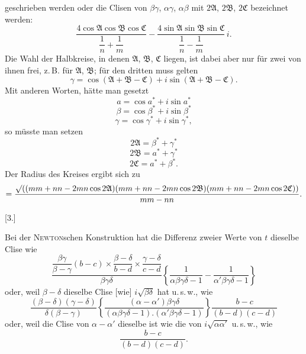 %
geschrieben werden oder die Clisen von $\beta\gamma$, $\alpha\gamma$, $\alpha\beta$ mit $2\mathfrak{A}$, $2\mathfrak{B}$, $2\mathfrak{C}$ bezeichnet werden:
\[
\frac{4\cos\mathfrak{A}\cos\mathfrak{B}\cos\mathfrak{C}}{\dfrac{1}{n}+\dfrac{1}{m}} - \frac{4\sin\mathfrak{A}\sin\mathfrak{B}\sin\mathfrak{C}}{\dfrac{1}{n}-\dfrac{1}{m}}\, i.
\]
Die Wahl der Halbkreise, in denen $\mathfrak{A}$, $\mathfrak{B}$, $\mathfrak{C}$ liegen, ist dabei aber nur für zwei von ihnen frei, z.\,B. für $\mathfrak{A}$, $\mathfrak{B}$; für den dritten muss gelten
\[
\gamma = \cos(\mathfrak{A}+\mathfrak{B}-\mathfrak{C}) + i\sin(\mathfrak{A}+\mathfrak{B}-\mathfrak{C}).
\]
Mit anderen Worten, hätte man gesetzt
\[
a = \cos a^{*} + i\sin a^{*}
\]
\[
\beta = \cos \beta^{*} + i\sin \beta^{*}
\]
\[
\gamma = \cos \gamma^{*} + i\sin \gamma^{*},
\]
so müsste man setzen
\[
2\mathfrak{A} = \beta^{*}+\gamma^{*}
\]
\[
2\mathfrak{B} = a^{*}+\gamma^{*}
\]
\[
2\mathfrak{C} = a^{*}+\beta^{*}.
\]
Der Radius des Kreises ergibt sich zu
\begingroup\small
\[
= \frac{\mathord{\surd}((mm+nn-2mn\cos 2\mathfrak{A})(mm+nn-2mn\cos 2\mathfrak{B})(mm+nn-2mn\cos 2\mathfrak{C}))}{mm-nn}.
\]
\endgroup

\begin{center}[3.]\end{center}

Bei der \textsc{Newton}schen Konstruktion hat die Differenz zweier Werte von $t$ dieselbe Clise wie
\[
\frac{\dfrac{\beta\gamma}{\beta-\gamma}(b-c)\times\dfrac{\beta-\delta}{b-d}\times\dfrac{\gamma-\delta}{c-d}}{\beta\gamma\delta}
\left\{\frac{1}{\alpha\beta\gamma\delta-1}-\frac{1}{\alpha'\beta\gamma\delta-1}\right\}
\]
oder, weil $\beta-\delta$ dieselbe Clise [wie] $i\sqrt{\beta\delta}$ hat u.\,s.\,w., wie
\[
\frac{(\beta-\delta)(\gamma-\delta)}{\delta(\beta-\gamma)}
\left\{\frac{(\alpha-\alpha')\beta\gamma\delta}{(\alpha\beta\gamma\delta-1).(\alpha'\beta\gamma\delta-1)}\right\}
\frac{b-c}{(b-d)(c-d)}
\]
oder, weil die Clise von $\alpha-\alpha'$ dieselbe ist wie die von $i\sqrt{\alpha\alpha'}$ u.\,s.\,w., wie
\[
\frac{b-c}{(b-d)(c-d)}.
\]
